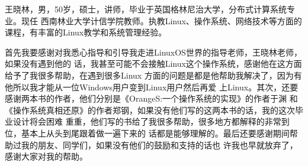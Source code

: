 \documentclass{swfuthesis}
\begin{document}
\mainmatter


\appendix %
\makebib %

\begin{advisorInfo} %
  王晓林，男，50岁，硕士，讲师，毕业于英国格林尼治大学，分布式计算系统专业。现任
  西南林业大学计信学院教师。执教Linux、操作系统、网络技术等方面的课程，有丰富的Linux教学和系统管理经验。
\end{advisorInfo}

\begin{acknowledgment} %
  首先我要感谢对我悉心指导和引导我走进LinuxOS世界的指导老师，王晓林老师，如果没有遇到他的
  话，我甚至可能不会接触Linux这个操作系统，感谢他在这方面给予了我很多帮助，在遇到很多Linux
  方面的问题是都是他帮助我解决了，因为有他所以我才能从一位Windows用户变到Linux用户然后再爱
  上Linux。其次，还要感谢两本书的作者，他们分别是《OrangeS:一个操作系统的实现》的作者于渊
  和《操作系统真相还原》的作者郑钢，如果没有他们写的这两本书的话，我的这次毕业设计将会困难
  重重，他们写的书给了我很多帮助，很多地方都解释的非常到位，基本上从头到尾跟着做一遍下来的
  话都是能够理解的。最后还要感谢期间帮助过我的朋友、同学们，如果没有他们的鼓励和支持的话也
  许我也早就放弃了，感谢大家对我的帮助。
\end{acknowledgment}

\singlespacing
%

\end{document}
